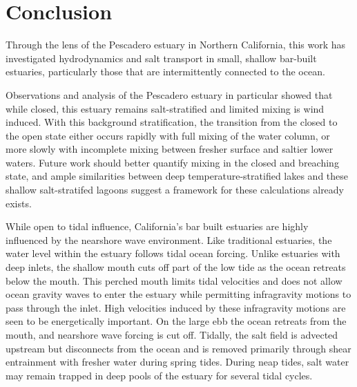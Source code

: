 \chapter{Conclusion}
\label{conclusion}

Through the lens of the Pescadero estuary in Northern California, this work has investigated hydrodynamics and salt transport in small, shallow bar-built estuaries, particularly those that are intermittently connected to the ocean. 

Observations and analysis of the Pescadero estuary in particular showed that while closed, this estuary remains salt-stratified and limited mixing is wind induced. With this background stratification, the transition from the closed to the open state either occurs rapidly with full mixing of the water column, or more slowly with incomplete mixing between fresher surface and saltier lower waters. Future work should better quantify mixing in the closed and breaching state, and ample similarities between deep temperature-stratified lakes and these shallow salt-stratifed lagoons suggest a framework for these calculations already exists.  

While open to tidal influence, California's bar built estuaries are highly influenced by the nearshore wave environment. Like traditional estuaries, the water level within the estuary follows tidal ocean forcing. Unlike estuaries with deep inlets, the shallow mouth cuts off part of the low tide as the ocean retreats below the mouth. This perched mouth limits tidal velocities and does not allow ocean gravity waves to enter the estuary while permitting infragravity motions to pass through the inlet. High velocities induced by these infragravity motions are seen to be energetically important. On the large ebb the ocean retreats from the mouth, and nearshore wave forcing is cut off. Tidally, the salt field is  advected upstream but disconnects from the ocean and is removed primarily through shear entrainment with fresher water during spring tides. During neap tides, salt water may remain trapped in deep pools of the estuary for several tidal cycles. 

